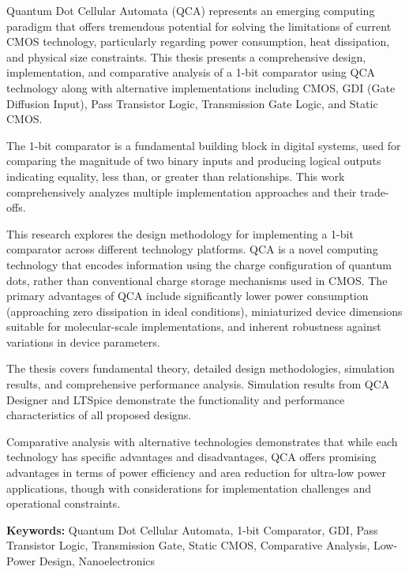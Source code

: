 \documentclass[12pt,a4paper,twoside]{report}
\begin{document}
Quantum Dot Cellular Automata (QCA) represents an emerging computing paradigm that offers tremendous potential for solving the limitations of current CMOS technology, particularly regarding power consumption, heat dissipation, and physical size constraints. This thesis presents a comprehensive design, implementation, and comparative analysis of a 1-bit comparator using QCA technology along with alternative implementations including CMOS, GDI (Gate Diffusion Input), Pass Transistor Logic, Transmission Gate Logic, and Static CMOS.

The 1-bit comparator is a fundamental building block in digital systems, used for comparing the magnitude of two binary inputs and producing logical outputs indicating equality, less than, or greater than relationships. This work comprehensively analyzes multiple implementation approaches and their trade-offs.

This research explores the design methodology for implementing a 1-bit comparator across different technology platforms. QCA is a novel computing technology that encodes information using the charge configuration of quantum dots, rather than conventional charge storage mechanisms used in CMOS. The primary advantages of QCA include significantly lower power consumption (approaching zero dissipation in ideal conditions), miniaturized device dimensions suitable for molecular-scale implementations, and inherent robustness against variations in device parameters.

The thesis covers fundamental theory, detailed design methodologies, simulation results, and comprehensive performance analysis. Simulation results from QCA Designer and LTSpice demonstrate the functionality and performance characteristics of all proposed designs.

Comparative analysis with alternative technologies demonstrates that while each technology has specific advantages and disadvantages, QCA offers promising advantages in terms of power efficiency and area reduction for ultra-low power applications, though with considerations for implementation challenges and operational constraints.

\vspace{1cm}

\noindent \textbf{Keywords:} Quantum Dot Cellular Automata, 1-bit Comparator, GDI, Pass Transistor Logic, Transmission Gate, Static CMOS, Comparative Analysis, Low-Power Design, Nanoelectronics

\tableofcontents
\end{document}
